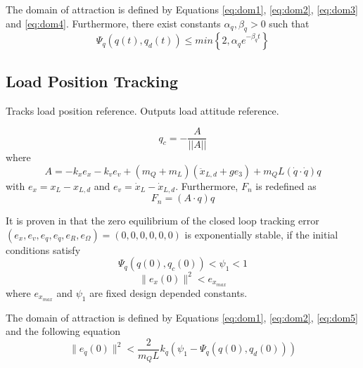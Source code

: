 The domain of attraction is defined by Equations \ref{eq:dom1}, \ref{eq:dom2}, \ref{eq:dom3} and \ref{eq:dom4}.
Furthermore, there exist constants $ \alpha_q,\beta_q>0 $ such that
\begin{equation}\label{eq:con.Psiqconv}
\Psi_q(q(t),q_d(t)) \leq min\left\lbrace 2,\alpha_qe^{-\beta_qt}\right\rbrace 
\end{equation}

\subsection{Load Position Tracking}\label{sec:con.loadpos}


Tracks load position reference. Outputs load attitude reference.

\begin{equation}\label{eq:con.q}
q_c = - \frac{A}{||A||}
\end{equation}
where
\begin{equation}\label{key}
A = -k_xe_x-k_ve_v+(m_Q+m_L)(\ddot{x}_{L,d}+ge_3)+m_QL(\dot{q}\cdot\dot{q})q
\end{equation}
with $ e_x=x_L-x_{L,d} $ and $ e_v=\dot{x}_L-\dot{x}_{L,d} $.
Furthermore, $ F_n $ is redefined as
\begin{equation}\label{key}
F_n=(A\cdot q)q
\end{equation}

It is proven in \cite{Sreenath2013c} that the zero equilibrium of the closed loop tracking error $ (e_x,e_v,e_q,e_{\dot{q}},e_R,e_\Omega)=(0,0,0,0,0,0) $ is exponentially stable, if the initial conditions satisfy
\begin{equation}\label{eq:dom5}
\Psi_q(q(0),q_c(0))<\psi_1<1
\end{equation}
\begin{equation}
\parallel e_{x}(0)\parallel^2<e_{x_{max}}
\end{equation}
where $ e_{x_{max}} $ and $ \psi_1 $ are fixed design depended constants. 

The domain of attraction is defined by Equations \ref{eq:dom1}, \ref{eq:dom2}, \ref{eq:dom5} and the following equation
\begin{equation}
\parallel e_{\dot{q}}(0)\parallel^2<\frac{2}{m_QL}{k_q}(\psi_1-\Psi_q(q(0),q_d(0)))
\end{equation}


